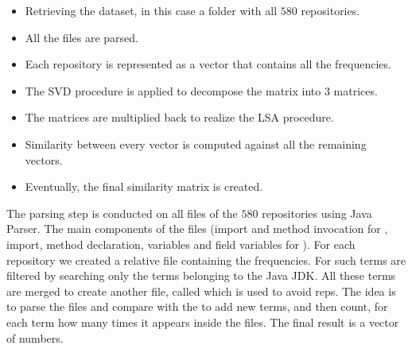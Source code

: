 \begin{itemize}
 \item Retrieving the dataset, in this case a folder with all $580$ repositories.
 \item All the  files are parsed.
 \item Each repository is represented as a vector that contains all the frequencies.%
 \item The SVD procedure is applied to decompose the matrix into $3$ matrices.
 \item The matrices are multiplied back to realize the LSA procedure.
 \item Similarity between every vector is computed against all the remaining vectors.%
 \item Eventually, the final similarity matrix is created.%
\end{itemize} 


%

The parsing step is conducted on all  files of the $580$ repositories using Java Parser. The main components of the files (import and method invocation for \CLAN, import, method declaration, variables and field variables for \MUDABlue). For each repository we created a relative  file containing the frequencies. For \CLAN such terms are filtered by searching only the terms belonging to the Java JDK. All these terms are merged to create another file, called  which is used to avoid reps. The idea is to parse the files and compare with the  to add new terms, and then count, for each term how many times it appears inside the files. The final result is a vector of numbers.



